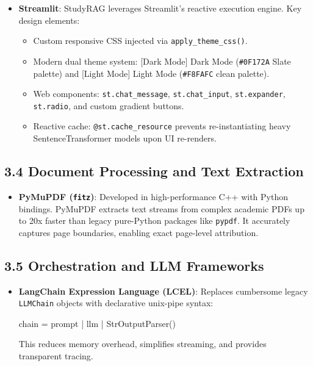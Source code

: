 \documentclass[
]{article}
\newenvironment{Shaded}{}{}
\newcommand{\NormalTok}[1]{#1}
\newcommand{\OperatorTok}[1]{\textcolor[rgb]{0.40,0.40,0.40}{#1}}
\providecommand{\tightlist}{%
  \setlength{\itemsep}{0pt}\setlength{\parskip}{0pt}}
\begin{document}
\begin{itemize}
\tightlist
\item
  \textbf{Streamlit}: StudyRAG leverages Streamlit's reactive execution
  engine. Key design elements:

  \begin{itemize}
  \tightlist
  \item
    Custom responsive CSS injected via \texttt{apply\_\allowbreak theme\_\allowbreak css(\allowbreak )\allowbreak }.
  \item
    Modern dual theme system: {[}Dark Mode{]} Dark Mode
    (\texttt{\#0F172A} Slate palette) and {[}Light Mode{]} Light Mode
    (\texttt{\#F8FAFC} clean palette).
  \item
    Web components: \texttt{st.\allowbreak chat\_\allowbreak message}, \texttt{st.\allowbreak chat\_\allowbreak input},
    \texttt{st.\allowbreak expander}, \texttt{st.\allowbreak radio}, and custom gradient
    buttons.
  \item
    Reactive cache: \texttt{@st.\allowbreak cache\_\allowbreak resource} prevents
    re-instantiating heavy SentenceTransformer models upon UI
    re-renders.
  \end{itemize}
\end{itemize}

\subsection{3.4 Document Processing and Text
Extraction}\label{document-processing-and-text-extraction}

\begin{itemize}
\tightlist
\item
  \textbf{PyMuPDF (\texttt{fitz})}: Developed in high-performance C++
  with Python bindings. PyMuPDF extracts text streams from complex
  academic PDFs up to 20x faster than legacy pure-Python packages like
  \texttt{pypdf}. It accurately captures page boundaries, enabling exact
  page-level attribution.
\end{itemize}

\subsection{3.5 Orchestration and LLM
Frameworks}\label{orchestration-and-llm-frameworks}

\begin{itemize}
\item
  \textbf{LangChain Expression Language (LCEL)}: Replaces cumbersome
  legacy \texttt{LLMChain} objects with declarative unix-pipe syntax:

\begin{Shaded}
\begin{Highlighting}[]
\NormalTok{chain }\OperatorTok{=}\NormalTok{ prompt }\OperatorTok{|}\NormalTok{ llm }\OperatorTok{|}\NormalTok{ StrOutputParser()}
\end{Highlighting}
\end{Shaded}

  This reduces memory overhead, simplifies streaming, and provides
  transparent tracing.
\end{itemize}
\end{document}
